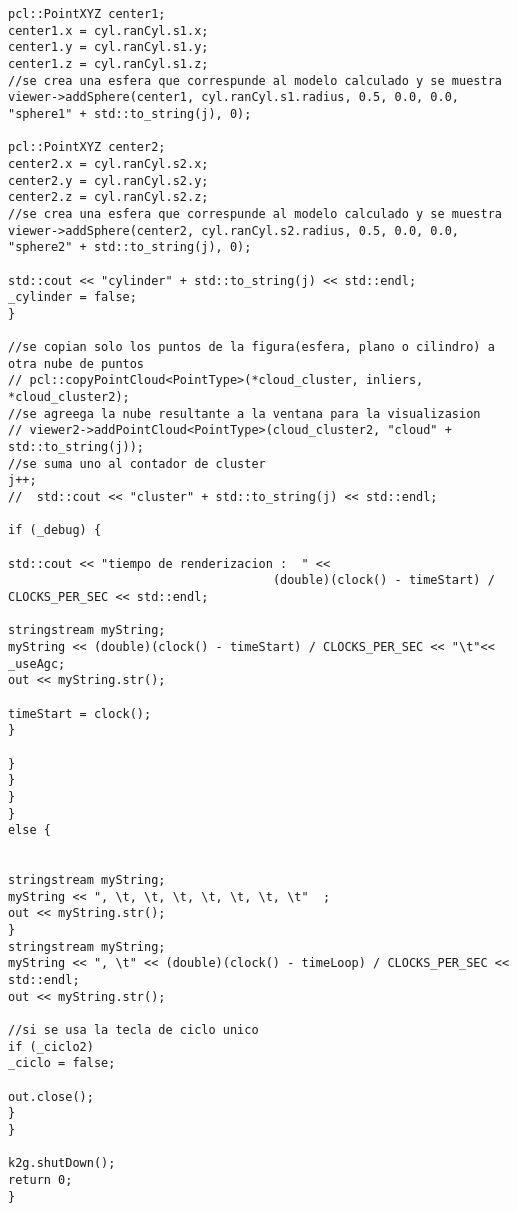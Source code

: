 {\begin{lstlisting}[caption={Archivo test.cpp}]
pcl::PointXYZ center1;
center1.x = cyl.ranCyl.s1.x;
center1.y = cyl.ranCyl.s1.y;
center1.z = cyl.ranCyl.s1.z;
//se crea una esfera que correspunde al modelo calculado y se muestra
viewer->addSphere(center1, cyl.ranCyl.s1.radius, 0.5, 0.0, 0.0, "sphere1" + std::to_string(j), 0);

pcl::PointXYZ center2;
center2.x = cyl.ranCyl.s2.x;
center2.y = cyl.ranCyl.s2.y;
center2.z = cyl.ranCyl.s2.z;
//se crea una esfera que correspunde al modelo calculado y se muestra
viewer->addSphere(center2, cyl.ranCyl.s2.radius, 0.5, 0.0, 0.0, "sphere2" + std::to_string(j), 0);

std::cout << "cylinder" + std::to_string(j) << std::endl;
_cylinder = false;
}

//se copian solo los puntos de la figura(esfera, plano o cilindro) a otra nube de puntos
// pcl::copyPointCloud<PointType>(*cloud_cluster, inliers, *cloud_cluster2);
//se agreega la nube resultante a la ventana para la visualizasion
// viewer2->addPointCloud<PointType>(cloud_cluster2, "cloud" + std::to_string(j));
//se suma uno al contador de cluster
j++;
//  std::cout << "cluster" + std::to_string(j) << std::endl;

if (_debug) {

std::cout << "tiempo de renderizacion :  " <<
									 (double)(clock() - timeStart) / CLOCKS_PER_SEC << std::endl;

stringstream myString;
myString << (double)(clock() - timeStart) / CLOCKS_PER_SEC << "\t"<< _useAgc;
out << myString.str();

timeStart = clock();
}

}
}
}
}
else {


stringstream myString;
myString << ", \t, \t, \t, \t, \t, \t, \t"  ;
out << myString.str();
}
stringstream myString;
myString << ", \t" << (double)(clock() - timeLoop) / CLOCKS_PER_SEC << std::endl;
out << myString.str();

//si se usa la tecla de ciclo unico
if (_ciclo2)
_ciclo = false;

out.close();
}
}

k2g.shutDown();
return 0;
}
	\end{lstlisting}
}$ $ \\


